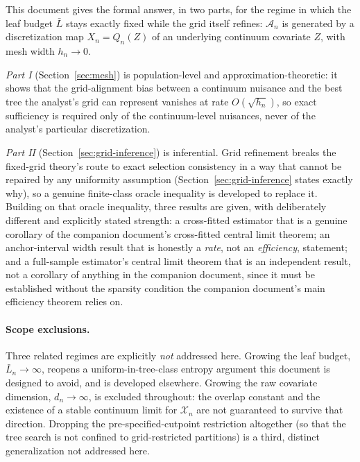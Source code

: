 \documentclass[11pt]{article}
\theoremstyle{plain}
\theoremstyle{definition}
\theoremstyle{remark}
\newcommand{\cX}{\mathcal{X}}
\newcommand{\cA}{\mathcal{A}}
\begin{document}
This document gives the formal answer, in two parts, for the regime in which
the leaf budget $\bar L$ stays exactly fixed while the grid itself refines:
$\cA_n$ is generated by a discretization map $X_n=Q_n(Z)$ of an underlying
continuum covariate $Z$, with mesh width $h_n\to0$.

\emph{Part I} (Section~\ref{sec:mesh}) is population-level and
approximation-theoretic: it shows that the grid-alignment bias between a
continuum nuisance and the best tree the analyst's grid can represent
vanishes at rate $O(\sqrt{h_n})$, so exact sufficiency is required only of
the continuum-level nuisances, never of the analyst's particular
discretization.

\emph{Part II} (Section~\ref{sec:grid-inference}) is inferential. Grid
refinement breaks the fixed-grid theory's route to exact selection
consistency in a way that cannot be repaired by any uniformity assumption
(Section~\ref{sec:grid-inference} states exactly why), so a genuine
finite-class oracle inequality is developed to replace it. Building on that
oracle inequality, three results are given, with deliberately different and
explicitly stated strength: a cross-fitted estimator that is a genuine
corollary of the companion document's cross-fitted central limit theorem; an
anchor-interval width result that is honestly a \emph{rate}, not an
\emph{efficiency}, statement; and a full-sample estimator's central limit
theorem that is an independent result, not a corollary of anything in the
companion document, since it must be established without the sparsity
condition the companion document's main efficiency theorem relies on.

\paragraph{Scope exclusions.} Three related regimes are explicitly
\emph{not} addressed here. Growing the leaf budget, $\bar L_n\to\infty$,
reopens a uniform-in-tree-class entropy argument this document is designed
to avoid, and is developed elsewhere. Growing the raw covariate dimension,
$d_n\to\infty$, is excluded throughout: the overlap constant and the
existence of a stable continuum limit for $\cX_n$ are not guaranteed to
survive that direction. Dropping the pre-specified-cutpoint restriction
altogether (so that the tree search is not confined to grid-restricted
partitions) is a third, distinct generalization not addressed here.
\end{document}
